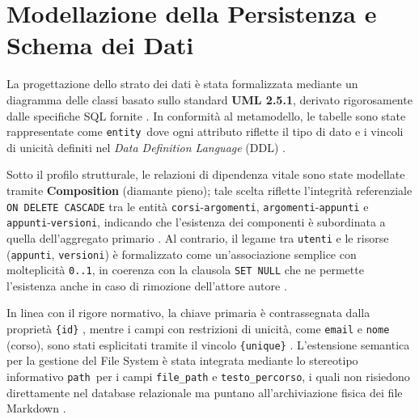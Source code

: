 \section{Modellazione della Persistenza e Schema dei Dati}

La progettazione dello strato dei dati è stata formalizzata mediante un diagramma delle classi basato sullo standard \textbf{UML 2.5.1}, derivato rigorosamente dalle specifiche SQL fornite \cite{1287}. In conformità al metamodello, le tabelle sono state rappresentate come \guillemotleft\texttt{entity}\guillemotright\ dove ogni attributo riflette il tipo di dato e i vincoli di unicità definiti nel \textit{Data Definition Language} (DDL) \cite{1287, 1288}.

Sotto il profilo strutturale, le relazioni di dipendenza vitale sono state modellate tramite \textbf{Composition} (diamante pieno); tale scelta riflette l'integrità referenziale \texttt{ON DELETE CASCADE} tra le entità \texttt{corsi}-\texttt{argomenti}, \texttt{argomenti}-\texttt{appunti} e \texttt{appunti}-\texttt{versioni}, indicando che l'esistenza dei componenti è subordinata a quella dell'aggregato primario \cite{437, 443, 1437, 1354}. Al contrario, il legame tra \texttt{utenti} e le risorse (\texttt{appunti}, \texttt{versioni}) è formalizzato come un'associazione semplice con molteplicità \texttt{0..1}, in coerenza con la clausola \texttt{SET NULL} che ne permette l'esistenza anche in caso di rimozione dell'attore autore \cite{1289, 1290}. 

In linea con il rigore normativo, la chiave primaria è contrassegnata dalla proprietà \texttt{\{id\}} \cite{1438, 1420}, mentre i campi con restrizioni di unicità, come \texttt{email} e \texttt{nome} (corso), sono stati esplicitati tramite il vincolo \texttt{\{unique\}} \cite{1420, 1378}. L'estensione semantica per la gestione del File System è stata integrata mediante lo stereotipo informativo \guillemotleft\texttt{path}\guillemotright\ per i campi \texttt{file\_path} e \texttt{testo\_percorso}, i quali non risiedono direttamente nel database relazionale ma puntano all'archiviazione fisica dei file Markdown \cite{1289, 1761}.


